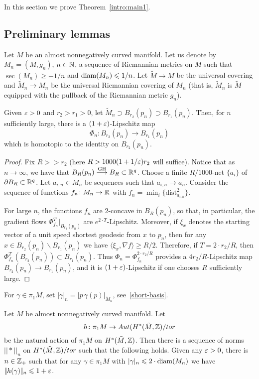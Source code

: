 \documentclass{amsart}
\begin{document}
In this section we prove Theorem~\ref{intro:main1}.



\subsection{Preliminary lemmas}
Let $M$ be an almost nonnegatively curved manifold.
Let us denote by $M_n=(M,g_n)$, $n\in {\Bbb N}$,
a sequence of Riemannian metrics on $M$ such that $\sec(M_n)\ge -1/n$
and $\operatorname{\rm diam}(M_n)\leqslant 1/n$.
Let $\tilde M\to M$ be the universal covering  and 
$\tilde M_n\to M_n$ be
the universal Riemannian covering of $M_n$
(that is, $\tilde M_n$ is
$\tilde M$ equipped with the pullback of the Riemannian metric $g_n$).


\begin{klem}\label{l:key} Given $\varepsilon>0$ and $r_2>r_1>0$,
let
$\tilde M_n\supset B_{r_2}(p_n)\supset B_{r_1}(p_n)$.
Then, for $n$ sufficiently large,
there is a  $(1+\varepsilon)$-Lipschitz map
\[\Phi_n\colon B_{r_2}(p_n)\to B_{r_1}(p_n)\]
which is homotopic to the identity on $B_{r_2}(p_n)$.
\end{klem}

\begin{proof} Fix $R>\!\!>r_2$
(here $R>1000(1+1/\varepsilon)r_2$ will suffice).
Notice that as $n\to\infty$, we have that $B_R(p_n)\GHto B_R\subset {\Bbb R}^q$.
Choose a finite $R/1000$-net $\{a_i\}$ of $\partial B_R\z\subset {\Bbb R}^q$.
Let $a_{i,n}\in M_n$ be sequences such that $a_{i,n} \to a_n$.
Consider the sequence of functions
$f_n\colon M_n\to {\Bbb R}$ with $f_n=\min_i\{\text{dist}^2_{a_{i,n}}\}$.

For large $n$, the functions $f_n$ are $2$-concave in $B_R(p_n)$,
so that, in particular, the gradient flows
$\Phi_{f_n}^T|_{B_{r_2}(p_n)}$ are $e^{2\cdot T}$-Lipschitz.
Moreover, if $\xi_x$ denotes
the starting vector of a unit speed shortest geodesic from $x$ to $p_n$,
then  for any $x\in B_{r_2}(p_n) \backslash B_{r_1}(p_n)$
we have $\langle\xi_x,\nabla f \rangle\ge R/2$.
Therefore, if $T=2\cdot r_2/R$, then $\Phi_{f_n}^T(B_{r_2}(p_n) )\subset B_{r_1}(p_n)$.
Thus $\Phi_n=\Phi_{f_n}^{2\cdot r_2/R}$ provides a
$4r_2/R$-Lipschitz map $B_{r_2}(p_n)\to B_{r_1}(p_n)$,
and it is $(1+\varepsilon)$-Lipschitz if one chooses $R$ sufficiently large.
\end{proof}

For $\gamma\in \pi_1M$, set $|\gamma|_n=|p\,\gamma(p)|_{\tilde M_n}$, see~\ref{short-basis}.

\begin{cor}\label{cor:norm} Let $M$ be almost nonnegatively curved manifold.
Let $$h\colon \pi_1M\to Aut(H^*(\tilde M,{\Bbb Z})/tor$$
be the natural  action of $\pi_1M$ on $H^*(\tilde M,{\Bbb Z})$.
Then there is a sequence of norms $|\!|*|\!|_n$ on
$H^*(\tilde M,{\Bbb Z})/tor$
such that the following holds.
Given any $\varepsilon>0$, there is $n\in {\Bbb Z}_+$
such that for any  $\gamma\in \pi_1M$
with $|\gamma|_n\leqslant 2\cdot \operatorname{\rm diam}(M_n)$ we have  $|\!|h(\gamma)|\!|_n\leqslant 1+\varepsilon$.

\end{cor}
\end{document}
